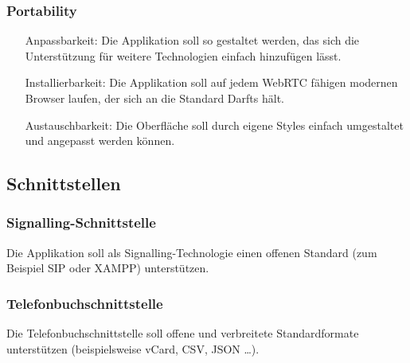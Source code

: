 
\subsubsection{Portability}
\begin{itemize}
	\item[Anpassbarkeit:] Die Applikation soll so gestaltet werden, das sich die Unterstützung für weitere Technologien einfach hinzufügen lässt.
	\item[Installierbarkeit:] Die Applikation soll auf jedem WebRTC fähigen modernen Browser laufen, der sich an die Standard Darfts hält.
	\item[Austauschbarkeit:] Die Oberfläche soll durch eigene Styles einfach umgestaltet und angepasst werden können.
\end{itemize}


\subsection{Schnittstellen}

\subsubsection{Signalling-Schnittstelle}
Die Applikation soll als Signalling-Technologie einen offenen Standard (zum
Beispiel SIP oder XAMPP) unterstützen.

\subsubsection{Telefonbuchschnittstelle}
Die Telefonbuchschnittstelle soll offene und verbreitete Standardformate
unterstützen (beispielsweise vCard, CSV, JSON …).
